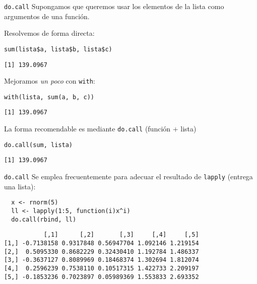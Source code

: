 \documentclass[xcolor={usenames,svgnames,dvipsnames}]{beamer}
\begin{document}
\begin{frame}[label={sec:orgcf8f19a},fragile]{\texttt{do.call}}
 Supongamos que queremos usar los elementos de la lista como argumentos de una función.

Resolvemos de forma directa:
\lstset{language=r,label= ,caption= ,captionpos=b,numbers=none}
\begin{lstlisting}
sum(lista$a, lista$b, lista$c)
\end{lstlisting}

\begin{verbatim}
[1] 139.0967
\end{verbatim}


Mejoramos \emph{un poco} con \texttt{with}:
\lstset{language=r,label= ,caption= ,captionpos=b,numbers=none}
\begin{lstlisting}
with(lista, sum(a, b, c))
\end{lstlisting}

\begin{verbatim}
[1] 139.0967
\end{verbatim}


La forma recomendable es mediante \texttt{do.call} (función + lista)
\lstset{language=r,label= ,caption= ,captionpos=b,numbers=none}
\begin{lstlisting}
do.call(sum, lista)
\end{lstlisting}

\begin{verbatim}
[1] 139.0967
\end{verbatim}
\end{frame}

\begin{frame}[label={sec:org80337b1},fragile]{\texttt{do.call}}
 Se emplea frecuentemente para adecuar el resultado de \texttt{lapply} (entrega una lista):
\lstset{language=r,label= ,caption= ,captionpos=b,numbers=none}
\begin{lstlisting}
  x <- rnorm(5)
  ll <- lapply(1:5, function(i)x^i)
  do.call(rbind, ll)
\end{lstlisting}

\begin{verbatim}
           [,1]      [,2]       [,3]     [,4]     [,5]
[1,] -0.7138158 0.9317848 0.56947704 1.092146 1.219154
[2,]  0.5095330 0.8682229 0.32430410 1.192784 1.486337
[3,] -0.3637127 0.8089969 0.18468374 1.302694 1.812074
[4,]  0.2596239 0.7538110 0.10517315 1.422733 2.209197
[5,] -0.1853236 0.7023897 0.05989369 1.553833 2.693352
\end{verbatim}
\end{frame}
\end{document}

